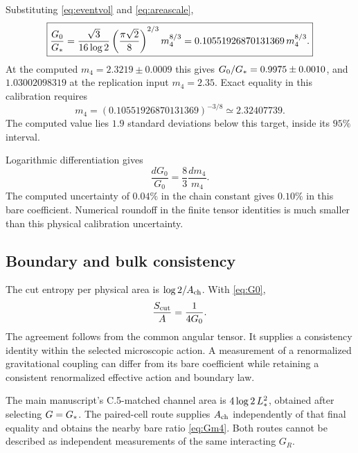 Substituting \eqref{eq:eventvol} and \eqref{eq:areascale},
\begin{equation}
\boxed{
\frac{G_0}{G_*}
=\frac{\sqrt3}{16\log2}
\left(\frac{\pi\sqrt2}{8}\right)^{2/3}m_4^{8/3}
=0.10551926870131369\,m_4^{8/3}.}
\label{eq:Gm4}
\end{equation}
At the computed $m_4=2.3219\pm0.0009$ this gives $G_0/G_*=0.9975\pm0.0010$, and $1.03002098319$ at the replication input $m_4=2.35$. Exact equality in this calibration requires
\begin{equation}
m_4=(0.10551926870131369)^{-3/8}\simeq2.32407739.
\end{equation}
The computed value lies $1.9$ standard deviations below this target, inside its $95\%$ interval.

Logarithmic differentiation gives
\begin{equation}
\frac{dG_0}{G_0}=\frac83\frac{dm_4}{m_4}.
\end{equation}
The computed uncertainty of $0.04\%$ in the chain constant gives $0.10\%$ in this bare coefficient. Numerical roundoff in the finite tensor identities is much smaller than this physical calibration uncertainty.

\subsection{Boundary and bulk consistency}

The cut entropy per physical area is $\log2/A_{\rm ch}$. With \eqref{eq:G0},
\begin{equation}
\frac{S_{\rm cut}}{A}=\frac1{4G_0}.
\end{equation}
The agreement follows from the common angular tensor. It supplies a consistency identity within the selected microscopic action. A measurement of a renormalized gravitational coupling can differ from its bare coefficient while retaining a consistent renormalized effective action and boundary law.

The main manuscript's C.5-matched channel area is $4\log2\,L_*^2$, obtained after selecting $G=G_*$. The paired-cell route supplies $A_{\rm ch}$ independently of that final equality and obtains the nearby bare ratio \eqref{eq:Gm4}. Both routes cannot be described as independent measurements of the same interacting $G_R$.
